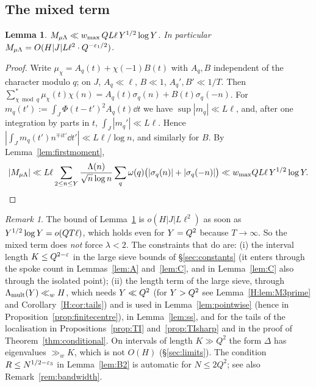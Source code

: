 \documentclass[11pt]{amsart}
\newtheorem{lemma}[theorem]{Lemma}
\theoremstyle{definition}
\theoremstyle{remark}
\newtheorem{remark}[theorem]{Remark}
\numberwithin{equation}{section}
\begin{document}
\subsection{The mixed term}
\begin{lemma}\label{lem:muLambda}
$M_{\mu\Lambda}\ll w_{\max}\,QL\ell\,Y^{1/2}\log Y$. In particular $M_{\mu\Lambda}=O(H|J|L\ell^2\cdot Q^{-\varepsilon_1/2})$.
\end{lemma}
\begin{proof}
Write $\mu_\chi=A_q(t)+\chi(-1)B(t)$ with $A_q,B$ independent of the character modulo $q$; on $J$, $A_q\ll\ell$, $B\ll1$, $A_q',B'\ll1/T$. Then $\sum_{\chi\bmod q}^*\mu_\chi(t)\chi(n)=A_q(t)\sigma_q(n)+B(t)\sigma_q(-n)$. For $m_q(t'):=\int_J\Phi(t-t')^2A_q(t)\dd t$ we have $\sup|m_q|\ll L\ell$, and, after one integration by parts in $t$, $\int_J|m_q'|\ll L\ell$. Hence $|\int_Jm_q(t')n^{\mp it'}\dd t'|\ll L\ell/\log n$, and similarly for $B$. By Lemma~\ref{lem:firstmoment},
\[
|M_{\mu\Lambda}|\ll L\ell\sum_{2\le n\le Y}\frac{\Lambda(n)}{\sqrt n\log n}\sum_q\omega(q)\big(|\sigma_q(n)|+|\sigma_q(-n)|\big)\ll w_{\max} QL\ell\,Y^{1/2}\log Y.\qedhere
\]
\end{proof}

\begin{remark}\label{rem:muP}
The bound of Lemma~\ref{lem:muLambda} is $o(H|J|L\ell^2)$ as soon as $Y^{1/2}\log Y=o(QT\ell)$, which holds even for $Y=Q^2$ because $T\to\infty$. So the mixed term does \emph{not} force $\lambda<2$. The constraints that do are: (i) the interval length $K\le Q^{2-\varepsilon}$ in the large sieve bounds of \S\ref{sec:constants} (it enters through the spoke count in Lemmas~\ref{lem:A} and~\ref{lem:C}, and in Lemma~\ref{lem:C} also through the isolated point); (ii) the length term of the large sieve, through $\Lambda_{\mathrm{mult}}(Y)\ll_wH$, which needs $Y\ll Q^2$ (for $Y>Q^2$ see Lemma~\ref{H:lem:M3prime} and Corollary~\ref{H:cor:tails}) and is used in Lemma~\ref{lem:pointwise} (hence in Proposition~\ref{prop:finitecentre}), in Lemma~\ref{lem:ss}, and for the tails of the localisation in Propositions~\ref{prop:TI} and~\ref{prop:TIsharp} and in the proof of Theorem~\ref{thm:conditional}. On intervals of length $K\gg Q^{2}$ the form $\Delta$ has eigenvalues $\gg_wK$, which is not $O(H)$ (\S\ref{sec:limits}). The condition $R\le N^{1/2-\varepsilon_3}$ in Lemma~\ref{lem:B2} is automatic for $N\le2Q^2$; see also Remark~\ref{rem:bandwidth}.
\end{remark}
\end{document}

